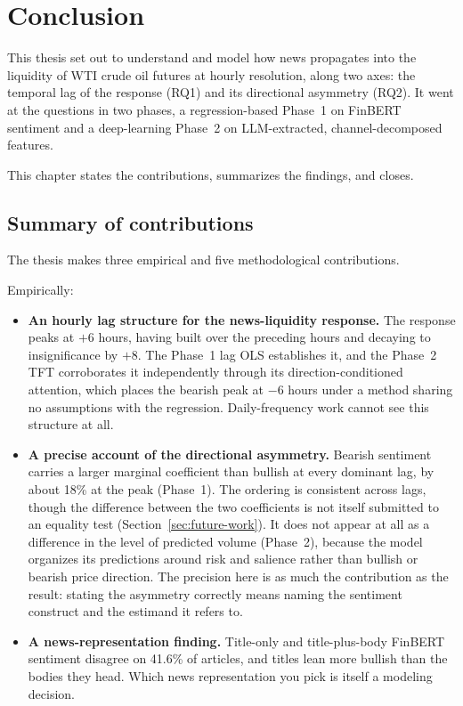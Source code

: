 \chapter{Conclusion}\label{chap:conclusion}

This thesis set out to understand and model how news propagates into the liquidity of WTI crude oil futures at hourly resolution, along two axes: the temporal lag of the response (RQ1) and its directional asymmetry (RQ2). It went at the questions in two phases, a regression-based Phase~1 on FinBERT sentiment and a deep-learning Phase~2 on LLM-extracted, channel-decomposed features.

This chapter states the contributions, summarizes the findings, and closes.

\section{Summary of contributions}\label{sec:contributions-summary}

The thesis makes three empirical and five methodological contributions.

Empirically:

\begin{itemize}
  \item \textbf{An hourly lag structure for the news-liquidity response.} The response peaks at $+6$ hours, having built over the preceding hours and decaying to insignificance by $+8$. The Phase~1 lag OLS establishes it, and the Phase~2 TFT corroborates it independently through its direction-conditioned attention, which places the bearish peak at $-6$ hours under a method sharing no assumptions with the regression. Daily-frequency work cannot see this structure at all.
  \item \textbf{A precise account of the directional asymmetry.} Bearish sentiment carries a larger marginal coefficient than bullish at every dominant lag, by about 18\% at the peak (Phase~1). The ordering is consistent across lags, though the difference between the two coefficients is not itself submitted to an equality test (Section~\ref{sec:future-work}). It does not appear at all as a difference in the level of predicted volume (Phase~2), because the model organizes its predictions around risk and salience rather than bullish or bearish price direction. The precision here is as much the contribution as the result: stating the asymmetry correctly means naming the sentiment construct and the estimand it refers to.
  \item \textbf{A news-representation finding.} Title-only and title-plus-body FinBERT sentiment disagree on 41.6\% of articles, and titles lean more bullish than the bodies they head. Which news representation you pick is itself a modeling decision.
\end{itemize}

